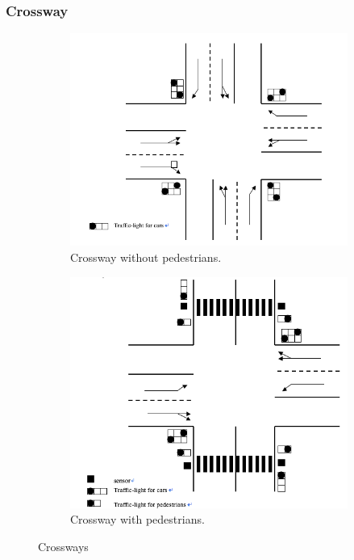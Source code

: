 \subsubsection{Crossway}
\begin{figure}
	\centering
	\begin{subfigure}{.5\textwidth}
		\centering
		\includegraphics[width=\linewidth]{figures/crosswaya.png}
		\caption{Crossway without pedestrians.}
		\label{fig:crossa}
	\end{subfigure}%
	\begin{subfigure}{.5\textwidth}
		\centering
		\includegraphics[width=\linewidth]{figures/crosswayb.png}
		\caption{Crossway with pedestrians.}
		\label{fig:crossb}
	\end{subfigure}
	\caption{Crossways}
	\label{fig:cross}
\end{figure}

